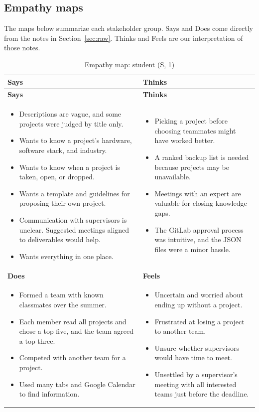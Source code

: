 \documentclass{article}
\newcommand{\intlink}[3]{\hyperref[int:#1-#2]{#3}}
\newcommand{\intref}[2]{\intlink{#1}{#2}{#1, #2}}
\newcommand{\empathymap}[6]{%
    \begin{longtable}{|p{0.465\textwidth}|p{0.465\textwidth}|}
    \caption{#1}\label{#2}\\
    \hline
    \textbf{Says} & \textbf{Thinks}\\ \hline
    \endfirsthead
    \hline
    \textbf{Says} & \textbf{Thinks}\\ \hline
    \endhead
    #3 & #4 \\ \hline
    \textbf{Does} & \textbf{Feels}\\ \hline
    #5 & #6 \\ \hline
    \end{longtable}}
\begin{document}
    \subsection{Empathy maps}
    \label{sec:maps}

    The maps below summarize each stakeholder group. Says and Does come directly from the notes in
    Section~\ref{sec:raw}. Thinks and Feels are our interpretation of those notes.

    \empathymap{Empathy map: student (\intref{S}{1})}{tab:map-student}
    {\begin{itemize}
         \item Descriptions are vague, and some projects were judged by title only.
         \item Wants to know a project's hardware, software stack, and industry.
         \item Wants to know when a project is taken, open, or dropped.
         \item Wants a template and guidelines for proposing their own project.
         \item Communication with supervisors is unclear. Suggested meetings aligned to deliverables would help.
         \item Wants everything in one place.
    \end{itemize}}
    {\begin{itemize}
         \item Picking a project before choosing teammates might have worked better.
         \item A ranked backup list is needed because projects may be unavailable.
         \item Meetings with an expert are valuable for closing knowledge gaps.
         \item The GitLab approval process was intuitive, and the JSON files were a minor hassle.
    \end{itemize}}
    {\begin{itemize}
         \item Formed a team with known classmates over the summer.
         \item Each member read all projects and chose a top five, and the team agreed a top three.
         \item Competed with another team for a project.
         \item Used many tabs and Google Calendar to find information.
    \end{itemize}}
    {\begin{itemize}
         \item Uncertain and worried about ending up without a project.
         \item Frustrated at losing a project to another team.
         \item Unsure whether supervisors would have time to meet.
         \item Unsettled by a supervisor's meeting with all interested teams just before the deadline.
    \end{itemize}}
\end{document}
